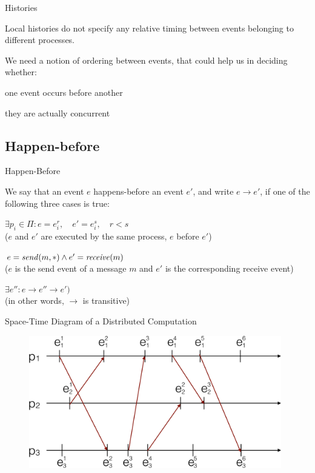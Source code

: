 \begin{frame}{Histories}

\BIL
\item Local histories do not specify any relative timing between events
  belonging to different processes.
\item We need a notion of ordering between events, that could help
  us in deciding whether:
  \BI
  \item one event occurs before another
  \item they are actually concurrent
  \EI
\EIL

\end{frame}

\subsection{Happen-before}

\begin{frame}{Happen-Before}

\begin{definition}
We say that an event $e$ \alert{happens-before} an event $e'$, and write \alert{$e \rightarrow e'$}, if one of the following three cases is true:
\smallskip
\BE
\item $\exists p_i \in \Pi: e = e_i^r, \quad e'=e_i^s, \quad r<s$ \\
  ($e$ and $e'$ are executed by the same process, $e$ before $e'$)
\smallskip
\item $e = \mathit{send}(m,*) \wedge e' = \mathit{receive}(m)$ \\
  ($e$ is the send event of a message $m$ and $e'$ is the corresponding
   receive event)
\smallskip
\item $\exists e'': e \rightarrow e'' \rightarrow e')$ \\
  (in other words, $\rightarrow$ is transitive)
\EE
\end{definition}
 
\end{frame}

\begin{frame}{Space-Time Diagram of a Distributed Computation}

\begin{figure} 
\includegraphics[width=11cm]{figs/03/diagram1}
\end{figure}	

\end{frame}



